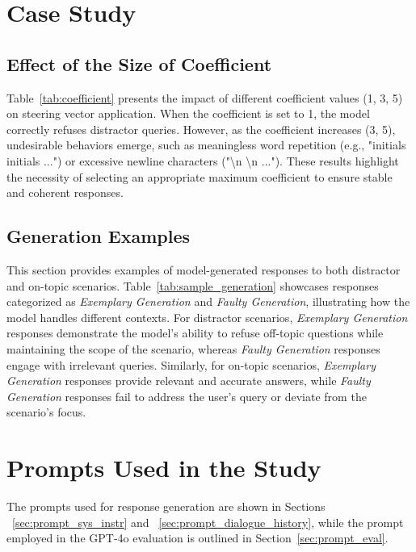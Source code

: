 \documentclass[11pt]{article}
\begin{document}
\section{Case Study}
\subsection{Effect of the Size of Coefficient}\label{sec:coefficient}
Table~\ref{tab:coefficient} presents the impact of different coefficient values (1, 3, 5) on steering vector application. When the coefficient is set to 1, the model correctly refuses distractor queries. However, as the coefficient increases (3, 5), undesirable behaviors emerge, such as meaningless word repetition (e.g., "initials initials ...") or excessive newline characters ("\textbackslash n \textbackslash n ..."). These results highlight the necessity of selecting an appropriate maximum coefficient to ensure stable and coherent responses.



\subsection{Generation Examples} This section provides examples of model-generated responses to both distractor and on-topic scenarios. Table~\ref{tab:sample_generation} showcases responses categorized as \textit{Exemplary Generation} and \textit{Faulty Generation}, illustrating how the model handles different contexts. For distractor scenarios, \textit{Exemplary Generation} responses demonstrate the model’s ability to refuse off-topic questions while maintaining the scope of the scenario, whereas \textit{Faulty Generation} responses engage with irrelevant queries. Similarly, for on-topic scenarios, \textit{Exemplary Generation} responses provide relevant and accurate answers, while \textit{Faulty Generation} responses fail to address the user’s query or deviate from the scenario’s focus.


\section{Prompts Used in the Study}\label{sec:prompt}
The prompts used for response generation are shown in Sections ~\ref{sec:prompt_sys_instr} and ~\ref{sec:prompt_dialogue_history}, while the prompt employed in the GPT-4o evaluation is outlined in Section~\ref{sec:prompt_eval}.
\end{document}
